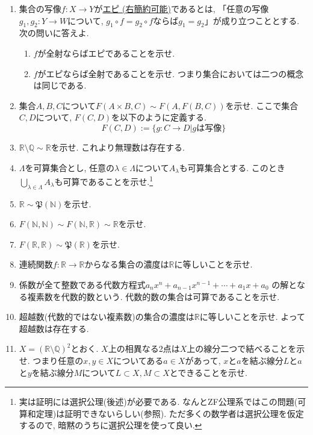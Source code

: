 \documentclass[dvipdfmx,a4paper,11pt]{article}
\newcommand{\R}{\mathbb{R}}
\newcommand{\Q}{\mathbb{Q}}
\newcommand{\N}{\mathbb{N}}
\theoremstyle{definition}
\begin{document}
\begin{enumerate}[label=\textbf{問}\ref*{sec-2}.\arabic*]
\item 集合の写像$f : X \to Y$が\underline{エピ (右簡約可能)}であるとは, 「任意の写像$g_1, g_2 : Y \to W$について, $g_1 \circ f = g_2 \circ f$ならば$g_1=g_2$」が成り立つこととする.
次の問いに答えよ. 
   \begin{enumerate}[label=(\arabic*).]
 \setlength{\parskip}{0cm}
  \setlength{\itemsep}{0pt}
\item $f$が全射ならばエピであることを示せ. 
\item $f$がエピならば全射であることを示せ. つまり集合においては二つの概念は同じである. 
\end{enumerate}
   \item  集合$A, B, C$について$F(A \times B, C) \sim F(A, F(B,C))$を示せ. ここで集合$C, D$について, $F(C,D)$を以下のように定義する.
$$
F(C,D):=\{ g : C \to D |\text{$g$は写像}\}
$$
   \item $\R \setminus \Q \sim \R$を示せ. これより無理数は存在する. 
 \item $\Lambda$を可算集合とし, 任意の$\lambda \in \Lambda$について$A_{\lambda}$も可算集合とする. このとき$\bigcup_{\lambda \in \Lambda}A_{\lambda}$も可算であることを示せ.\footnote{実は証明には選択公理(後述)が必要である. なんとZF公理系ではこの問題(可算和定理)は証明できないらしい(\cite{alg-6}参照). ただ多くの数学者は選択公理を仮定するので, 暗黙のうちに選択公理を使って良い.}
 \item $\R \sim \mathfrak{P}(\N)$を示せ.
  \item $F(\N, \N) \sim F(\N, \R)\sim \R$を示せ.
 \item $F(\R, \R)\sim \mathfrak{P}(\R)$を示せ.
 \item 連続関数$f : \R \to \R$からなる集合の濃度は$\R$に等しいことを示せ. 
 \item 係数が全て整数である代数方程式$a_n x^n + a_{n-1}x^{n-1} + \cdots + a_1 x + a_0$
 の解となる複素数を代数的数という. 代数的数の集合は可算であることを示せ. 
 \item 超越数(代数的ではない複素数)の集合の濃度は$\R$に等しいことを示せ. よって超越数は存在する. 
 \item $X = (\R \setminus \Q)^2$とおく. $X$上の相異なる2点は$X$上の線分二つで結べることを示せ. つまり任意の$x, y \in X$についてある$a \in X$があって, $x$と$a$を結ぶ線分$L$と$a$と$y$を結ぶ線分$M$について$L \subset X, M \subset X$とできることを示せ.
 \end{enumerate}
\end{document}
